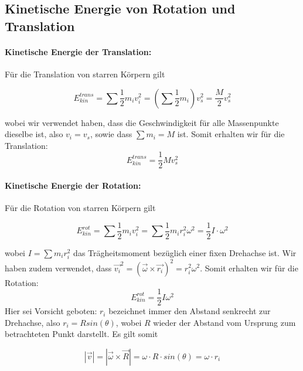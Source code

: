 \documentclass[12pt]{article}
\begin{document}
\newpage
\subsection{Kinetische Energie von Rotation und Translation}

\paragraph{Kinetische Energie der Translation:}Für die Translation von starren Körpern gilt

\begin{equation}
 E_{kin}^{trans} = \sum \dfrac{1}{2}m_i v_i^2 = \left(\sum \dfrac{1}{2} m_i \right) v_s^2 = \dfrac{M}{2} v_s^2
\end{equation}

 wobei wir verwendet haben, dass die Geschwindigkeit für alle Massenpunkte dieselbe ist, also $v_i = v_s$, sowie dass $\sum m_i = M$ ist. Somit erhalten wir für die Translation:
\begin{equation}
E_{kin}^{trans} = \dfrac{1}{2} M v_s^2
\end{equation}

\paragraph{Kinetische Energie der Rotation:}Für die Rotation von starren Körpern gilt 

\begin{equation}
 E_{kin}^{rot} = \sum \dfrac{1}{2} m_i v_i^2 = \sum \dfrac{1}{2} m_i r_i^2 \omega^2 = \dfrac{1}{2} I \cdot \omega^2
\end{equation}


wobei $I=\sum m_i r_i^2$ das Trägheitsmoment bezüglich einer fixen Drehachse ist. Wir haben zudem verwendet, dass $\vec{v_i}^2 = (\vec{\omega} \times \vec{r_i})^2 = r_i^2 \omega^2$. Somit erhalten wir für die Rotation:
\begin{equation}
E_{kin}^{rot} = \dfrac{1}{2} I \omega^2
\end{equation}
Hier sei Vorsicht geboten: $r_i$ bezeichnet immer den Abstand senkrecht zur Drehachse, also $r_i = R sin(\theta)$, wobei $R$ wieder der Abstand vom Ursprung zum betrachteten Punkt darstellt. Es gilt somit 

\begin{equation}
 |\vec{v}| = |\vec{\omega} \times \vec{R}| = \omega \cdot R \cdot sin(\theta) = \omega \cdot r_i
\end{equation}
\end{document}
